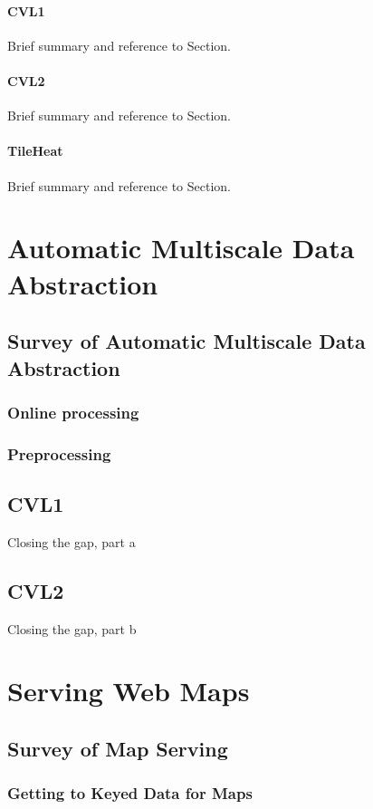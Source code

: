 \documentclass[11pt, oneside]{report}   	%
\begin{document}
\subsection{CVL1}
Brief summary and reference to Section.
\subsection{CVL2}
Brief summary and reference to Section.
\subsection{TileHeat}
Brief summary and reference to Section.


\part{Automatic Multiscale Data Abstraction}

\chapter{Survey of Automatic Multiscale Data Abstraction}

\section{Online processing}

\section{Preprocessing}

\chapter{CVL1}
Closing the gap, part a

\chapter{CVL2} 
Closing the gap, part b

\part{Serving Web Maps}

\chapter{Survey of Map Serving}

\section{Getting to Keyed Data for Maps}
\end{document}
